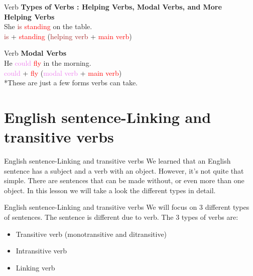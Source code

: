\documentclass{beamer}
\begin{document}
\begin{frame}{Verb}
\centering
\textbf{Types of Verbs : Helping Verbs, Modal Verbs, and More}\\ 
\vspace{0.2in}
\textbf{Helping Verbs}\\
\vspace{0.2in}
She \textcolor{brown}{is} \textcolor{red}{standing} on the table.\\
\vspace{0.2in}
\textcolor{brown}{is} + \textcolor{red}{standing} (\textcolor{brown}{helping verb} + \textcolor{red}{main verb})
\end{frame}
\begin{frame}{Verb}
\centering
\textbf{Modal Verbs}\\
\vspace{0.2in}
He \textcolor{violet}{could} \textcolor{red}{fly} in the morning.\\
\vspace{0.2in}
\textcolor{violet}{could} + \textcolor{red}{fly} (\textcolor{violet}{modal verb} + \textcolor{red}{main verb})\\
\vspace{0.2in}
*These are just a few forms verbs can take.
\section{English sentence-Linking and transitive verbs}
\end{frame}
\begin{frame}{English sentence-Linking and transitive verbs} 
\centering
We learned that an English sentence has a subject and a verb with an object. However, it's not quite that simple. There are sentences that can be made without, or even more than one object. In this lesson we will take a look the different types in detail. 

    
\end{frame}
\begin{frame}{English sentence-Linking and transitive verbs}
\centering
We will focus on 3 different types of sentences. The sentence is different due to verb. The 3 types of verbs are:\\
\vspace{0.2in}
\begin{itemize}
    \item Transitive verb (monotransitive and ditransitive)
    \item Intransitive verb
    \item Linking verb
\end{itemize}
    
\end{frame}
\end{document}
